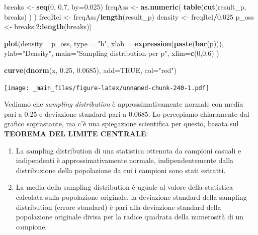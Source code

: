 \documentclass[a4paper,12pt,oneside]{book}
\providecommand{\tightlist}{%
  \setlength{\itemsep}{0pt}\setlength{\parskip}{0pt}}
\newenvironment{Shaded}{\begin{snugshade}}{\end{snugshade}}
\newcommand{\KeywordTok}[1]{\textcolor[rgb]{0.13,0.29,0.53}{\textbf{#1}}}
\newcommand{\DataTypeTok}[1]{\textcolor[rgb]{0.13,0.29,0.53}{#1}}
\newcommand{\DecValTok}[1]{\textcolor[rgb]{0.00,0.00,0.81}{#1}}
\newcommand{\FloatTok}[1]{\textcolor[rgb]{0.00,0.00,0.81}{#1}}
\newcommand{\StringTok}[1]{\textcolor[rgb]{0.31,0.60,0.02}{#1}}
\newcommand{\OtherTok}[1]{\textcolor[rgb]{0.56,0.35,0.01}{#1}}
\newcommand{\OperatorTok}[1]{\textcolor[rgb]{0.81,0.36,0.00}{\textbf{#1}}}
\newcommand{\NormalTok}[1]{#1}
\theoremstyle{definition}
\theoremstyle{definition}
\theoremstyle{definition}
\theoremstyle{remark}
\begin{document}
\begin{Shaded}
\begin{Highlighting}[]
\NormalTok{breaks <-}\StringTok{ }\KeywordTok{seq}\NormalTok{(}\DecValTok{0}\NormalTok{, }\FloatTok{0.7}\NormalTok{, }\DataTypeTok{by=}\FloatTok{0.025}\NormalTok{)}
\NormalTok{freqAss <-}\StringTok{ }\KeywordTok{as.numeric}\NormalTok{( }\KeywordTok{table}\NormalTok{(}\KeywordTok{cut}\NormalTok{(result_p, breaks) ) ) }
\NormalTok{freqRel <-}\StringTok{ }\NormalTok{freqAss}\OperatorTok{/}\KeywordTok{length}\NormalTok{(result_p)}
\NormalTok{density <-}\StringTok{ }\NormalTok{freqRel}\OperatorTok{/}\FloatTok{0.025}
\NormalTok{p_oss <-}\StringTok{ }\NormalTok{breaks[}\DecValTok{2}\OperatorTok{:}\KeywordTok{length}\NormalTok{(breaks)]}

\KeywordTok{plot}\NormalTok{(density }\OperatorTok{~}\StringTok{ }\NormalTok{p_oss, }\DataTypeTok{type =} \StringTok{"h"}\NormalTok{,}
     \DataTypeTok{xlab =} \KeywordTok{expression}\NormalTok{(}\KeywordTok{paste}\NormalTok{(}\KeywordTok{bar}\NormalTok{(p))),}
     \DataTypeTok{ylab=}\StringTok{"Density"}\NormalTok{, }
    \DataTypeTok{main=}\StringTok{"Sampling distribution per p"}\NormalTok{, }
    \DataTypeTok{xlim=}\KeywordTok{c}\NormalTok{(}\DecValTok{0}\NormalTok{,}\FloatTok{0.6}\NormalTok{) )}

\KeywordTok{curve}\NormalTok{(}\KeywordTok{dnorm}\NormalTok{(x, }\FloatTok{0.25}\NormalTok{, }\FloatTok{0.0685}\NormalTok{), }\DataTypeTok{add=}\OtherTok{TRUE}\NormalTok{, }\DataTypeTok{col=}\StringTok{"red"}\NormalTok{)}
\end{Highlighting}
\end{Shaded}

\texttt{[image: \_main\_files/figure-latex/unnamed-chunk-240-1.pdf]}

Vediamo che \emph{sampling distribution} è approssimativamente normale
con media pari a 0.25 e deviazione standard pari a 0.0685. Lo percepiamo
chiaramente dal grafico soprastante, ma c'è una spiegazione scientifica
per questo, basata sul \textbf{TEOREMA DEL LIMITE CENTRALE}:

\begin{enumerate}
\def\labelenumi{\arabic{enumi}.}
\tightlist
\item
  La sampling distribution di una statistica ottenuta da campioni
  casuali e indipendenti è approssimativamente normale,
  indipendentemente dalla distribuzione della popolazione da cui i
  campioni sono stati estratti.
\item
  La media della sampling distribution è uguale al valore della
  statistica calcolata sulla popolazione originale, la deviazione
  standard della sampling distribution (errore standard) è pari alla
  deviazione standard della popolazione originale divisa per la radice
  quadrata della numerosità di un campione.
\end{enumerate}
\end{document}
